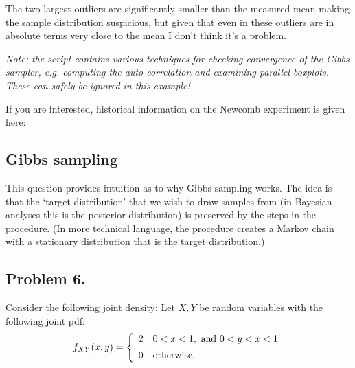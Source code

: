 \documentclass{article}
\newcommand{\1}{\mathbf{1}}
\begin{document}
\begin{enumerate}
\begin{enumerate}
        The two largest outliers are significantly smaller than the measured mean making the sample distribution suspicious, but given that even in these outliers are in absolute terms very close to the mean I don't think it's a problem.
\end{enumerate}

{\it\scriptsize Note: the script contains various techniques for checking convergence of the Gibbs sampler, e.g. computing the auto-correlation and examining parallel boxplots. These can safely be ignored in this example!}
\end{enumerate}
{\small If you are interested, historical information on the Newcomb experiment is given here:
\par
}
\eject

\subsection*{Gibbs sampling}

This question provides intuition as to why Gibbs sampling works. The idea is that the `target distribution' that we wish to draw samples from (in Bayesian analyses this is the posterior distribution) is preserved by the steps in the procedure. (In more technical language, the procedure creates a Markov chain with a stationary distribution that is the target distribution.)

\subsection*{Problem 6.}
Consider the following joint density: Let  $X,Y$ be random variables with the following joint pdf:
\begin{equation}\label{eq:one}
    f_{XY}(x,y) = \left\{  \begin{array}{cl}
        2 &   0< x <1,\hbox{ and } 0 < y < x < 1 \\[5pt]
        0   & \hbox{otherwise,}
        \end{array}
    \right.
\end{equation}
\end{document}
